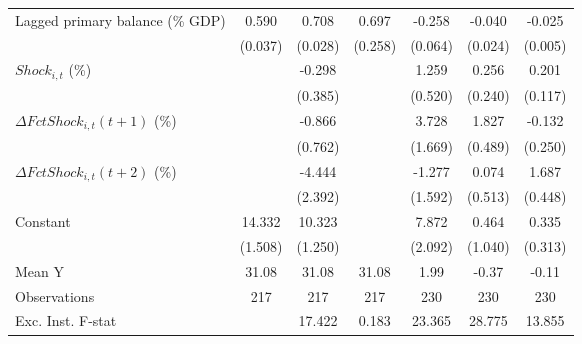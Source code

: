 {\begin{tabular}{l*{6}{c}}
\addlinespace
Lagged primary balance (\% GDP)&       0.590\sym{***}&       0.708\sym{***}&       0.697\sym{***}&      -0.258\sym{***}&      -0.040         &      -0.025\sym{***}\\
                    &     (0.037)         &     (0.028)         &     (0.258)         &     (0.064)         &     (0.024)         &     (0.005)         \\
\addlinespace
$ Shock_{i,t}$ (\%) &                     &      -0.298         &                     &       1.259\sym{**} &       0.256         &       0.201         \\
                    &                     &     (0.385)         &                     &     (0.520)         &     (0.240)         &     (0.117)         \\
\addlinespace
$ \Delta FctShock_{i,t}(t+1)$ (\%)&                     &      -0.866         &                     &       3.728\sym{**} &       1.827\sym{***}&      -0.132         \\
                    &                     &     (0.762)         &                     &     (1.669)         &     (0.489)         &     (0.250)         \\
\addlinespace
$ \Delta FctShock_{i,t}(t+2)$ (\%)&                     &      -4.444\sym{*}  &                     &      -1.277         &       0.074         &       1.687\sym{***}\\
                    &                     &     (2.392)         &                     &     (1.592)         &     (0.513)         &     (0.448)         \\
\addlinespace
Constant            &      14.332\sym{***}&      10.323\sym{***}&                     &       7.872\sym{***}&       0.464         &       0.335         \\
                    &     (1.508)         &     (1.250)         &                     &     (2.092)         &     (1.040)         &     (0.313)         \\
\midrule
Mean Y              &       31.08         &       31.08         &       31.08         &        1.99         &       -0.37         &       -0.11         \\
Observations        &         217         &         217         &         217         &         230         &         230         &         230         \\
Exc. Inst. F-stat   &                     &      17.422         &       0.183         &      23.365         &      28.775         &      13.855         \\
\bottomrule
\end{tabular}
}
